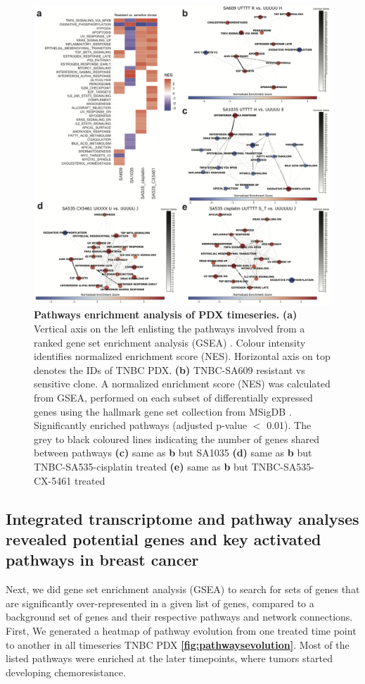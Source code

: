 \begin{figure}
\centering
  \includegraphics[width=\textwidth]{Figures/chap5/pathwaysnetwork.png}
\caption[Pathways enrichment analysis of PDX timeseries]
	{\small
	\textbf{Pathways enrichment analysis of PDX timeseries.}
	 	\textbf{(a)} Vertical axis on the left enlisting the pathways involved from a ranked gene set enrichment analysis (GSEA) \cite{shi2007gene}. Colour intensity identifies normalized enrichment score (NES). Horizontal axis on top denotes the IDs of TNBC PDX. \textbf{(b)} TNBC-SA609 resistant vs sensitive clone.  A normalized enrichment score (NES) was calculated from GSEA, performed on each subset of differentially expressed genes using the hallmark gene set collection from MSigDB \cite{liberzon2015molecular}. Significantly enriched pathways (adjusted p-value $<$ 0.01). The grey to black coloured lines indicating the number of genes shared between pathways \textbf{(c)} same as \textbf{b} but SA1035 \textbf{(d)} same as \textbf{b} but TNBC-SA535-cisplatin treated \textbf{(e)} same as \textbf{b} but TNBC-SA535-CX-5461 treated
	}
	\label{fig:pathwaysnetwork}
\end{figure}

\subsection{Integrated transcriptome and pathway analyses revealed potential genes and key activated pathways in breast cancer}
Next, we did gene set enrichment analysis (GSEA) to search for sets of genes that are significantly over-represented in a given list of genes, compared to a background set of genes and their respective pathways and network connections. First, We generated a heatmap of pathway evolution from one treated time point to another in all timeseries TNBC PDX \textbf{\autoref{fig:pathwaysevolution}}. Most of the listed pathways were enriched at the later timepoints, where tumors started developing chemoresistance. 

